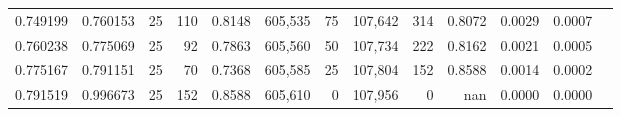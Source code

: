 \begin{tabular}{rrrrrrrrrrrrr}
0.749199 & 0.760153 &    25 & 110 &                                     0.8148 & 605,535 &      75 & 107,642 &     314 & 0.8072 & 0.0029 & 0.0007 \\
0.760238 & 0.775069 &    25 &  92 &                                     0.7863 & 605,560 &      50 & 107,734 &     222 & 0.8162 & 0.0021 & 0.0005 \\
0.775167 & 0.791151 &    25 &  70 &                                     0.7368 & 605,585 &      25 & 107,804 &     152 & 0.8588 & 0.0014 & 0.0002 \\
0.791519 & 0.996673 &    25 & 152 &                                     0.8588 & 605,610 &       0 & 107,956 &       0 &    nan & 0.0000 & 0.0000 \\
\bottomrule
\end{tabular}
